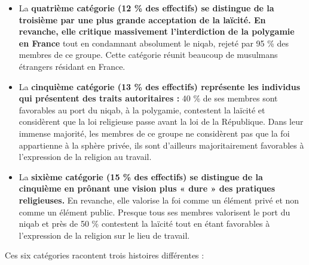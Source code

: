 \begin{itemize}
\item
  La \textbf{quatrième catégorie (12 \% des effectifs) se distingue de
  la troisième par une plus grande acceptation de la laïcité. En
  revanche, elle critique massivement l'interdiction de la polygamie en
  France} tout en condamnant absolument le niqab, rejeté par 95 \% des
  membres de ce groupe. Cette catégorie réunit beaucoup de musulmans
  étrangers résidant en France.
\item
  La \textbf{cinquième catégorie (13 \% des effectifs) représente les
  individus qui présentent des traits autoritaires :} 40 \% de ses
  membres sont favorables au port du niqab, à la polygamie, contestent
  la laïcité et considèrent que la loi religieuse passe avant la loi de
  la République. Dans leur immense majorité, les membres de ce groupe ne
  considèrent pas que la foi appartienne à la sphère privée, ils sont
  d'ailleurs majoritairement favorables à l'expression de la religion au
  travail.
\item
  La \textbf{sixième catégorie (15 \% des effectifs) se distingue de la
  cinquième en prônant une vision plus « dure » des pratiques
  religieuses.} En revanche, elle valorise la foi comme un élément privé
  et non comme un élément public. Presque tous ses membres valorisent le
  port du niqab et près de 50 \% contestent la laïcité tout en étant
  favorables à l'expression de la religion sur le lieu de travail.
\end{itemize}


Ces six catégories racontent trois histoires différentes :


